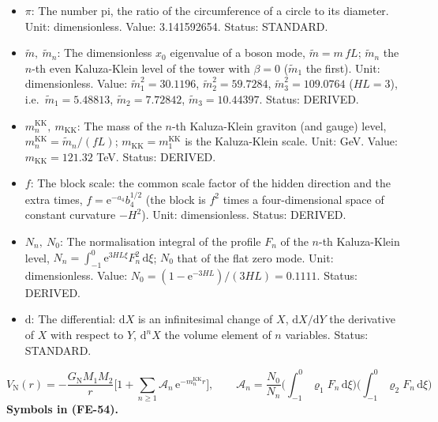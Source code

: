 \documentclass[
  10pt,
]{article}
\begin{document}
\begin{itemize}
  even level (\(\varpi_n = n\pi\) for \(\beta = 0\)). Unit:
  dimensionless. Value: 1.89901 for the lowest odd level of
  dirac16complex. Status: DERIVED.
\item
  \(\pi\): The number pi, the ratio of the circumference of a circle to
  its diameter. Unit: dimensionless. Value: 3.141592654. Status:
  STANDARD.
\item
  \(\tilde m,\ \tilde m_n\): The dimensionless \(x_0\) eigenvalue of a
  boson mode, \(\tilde m = m\,fL\); \(\tilde m_n\) the \(n\)-th even
  Kaluza-Klein level of the tower with \(\beta = 0\) (\(\tilde m_1\) the
  first). Unit: dimensionless. Value: \(\tilde m_1^2 = 30.1196\),
  \(\tilde m_2^2 = 59.7284\), \(\tilde m_3^2 = 109.0764\) (\(HL = 3\)),
  i.e.~\(\tilde m_1 = 5.48813\), \(\tilde m_2 = 7.72842\),
  \(\tilde m_3 = 10.44397\). Status: DERIVED.
\item
  \(m^{\mathrm{KK}}_n,\ m_{\mathrm{KK}}\): The mass of the \(n\)-th
  Kaluza-Klein graviton (and gauge) level,
  \(m^{\mathrm{KK}}_n = \tilde m_n/(fL)\);
  \(m_{\mathrm{KK}} = m^{\mathrm{KK}}_1\) is the Kaluza-Klein scale.
  Unit: GeV. Value: \(m_{\mathrm{KK}} = 121.32\) TeV. Status: DERIVED.
\item
  \(f\): The block scale: the common scale factor of the hidden
  direction and the extra times, \(f = \mathrm{e}^{-a_4}b_4^{1/2}\) (the
  block is \(f^2\) times a four-dimensional space of constant curvature
  \(-H^2\)). Unit: dimensionless. Status: DERIVED.
\item
  \(N_n,\ N_0\): The normalisation integral of the profile \(F_n\) of
  the \(n\)-th Kaluza-Klein level,
  \(N_n = \int_{-1}^{0}\mathrm{e}^{3HL\xi}F_n^2\,\mathrm{d}\xi\);
  \(N_0\) that of the flat zero mode. Unit: dimensionless. Value:
  \(N_0 = (1 - \mathrm{e}^{-3HL})/(3HL) = 0.1111\). Status: DERIVED.
\item
  \(\mathrm{d}\): The differential: \(\mathrm{d}X\) is an infinitesimal
  change of \(X\), \(\mathrm{d}X/\mathrm{d}Y\) the derivative of \(X\)
  with respect to \(Y\), \(\mathrm{d}^nX\) the volume element of \(n\)
  variables. Status: STANDARD.
\end{itemize}

\[
V_{\mathrm{N}}(r) = -\frac{G_{\mathrm{N}}M_1M_2}{r}\Big[1 +
 \sum_{n\ge1}\mathcal{A}_n\,\mathrm{e}^{-m^{\mathrm{KK}}_nr}\Big],\qquad
\mathcal{A}_n = \frac{N_0}{N_n}\Big(\int_{-1}^{0}\varrho_1F_n\,\mathrm{d}\xi\Big)\Big(\int_{-1}^{0}
 \varrho_2F_n\,\mathrm{d}\xi\Big) \tag{FE-54}
\] \textbf{Symbols in (FE-54).}
\end{document}
